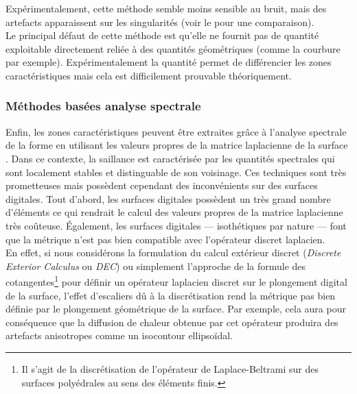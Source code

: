 %
Expérimentalement, cette méthode semble moins sensible au bruit, mais des
artefacts apparaissent sur les singularités (voir le
 pour une comparaison).
%
\\
%
Le principal défaut de cette méthode est qu'elle ne fournit pas de quantité
exploitable directement reliée à des quantités géométriques (comme la courbure
par exemple). Expérimentalement la quantité permet de différencier les zones
caractéristiques mais cela est difficilement prouvable théoriquement.
%
\subsubsection{Méthodes basées analyse spectrale}%
\label{sec:applications:feature:spectral}
%
Enfin, les zones caractéristiques peuvent être extraites grâce à l'analyse
spectrale de la forme en utilisant les valeurs propres de la matrice laplacienne
de la surface \cite{GebalBAL09,Sun2009,Song2014}. Dans ce contexte, la saillance
est caractérisée par les quantités spectrales qui sont localement stables et
distinguable de son voisinage. Ces techniques sont très prometteuses mais
possèdent cependant des inconvénients sur des surfaces digitales. Tout d'abord,
les surfaces digitales possèdent un très grand nombre d'éléments ce qui rendrait
le calcul des valeurs propres de la matrice laplacienne très coûteuse.
Également, les surfaces digitales --- isothétiques par nature --- font que la
métrique n'est pas bien compatible avec l'opérateur discret laplacien.
%
\\
%
En effet, si nous considérons la formulation du calcul extérieur discret
(\emph{Discrete Exterior Calculus} ou \emph{DEC}) ou simplement l'approche de la
formule des cotangentes\footnote{Il s'agit de la discrétisation de l'opérateur
de Laplace-Beltrami sur des surfaces polyédrales au sens des éléments finis.}
pour définir un opérateur laplacien discret sur le plongement digital de la
surface, l'effet d'escaliers dû à la discrétisation rend la métrique pas bien
définie par le plongement géométrique de la surface. Par exemple, cela aura pour
conséquence que la diffusion de chaleur obtenue par cet opérateur produira des
artefacts anisotropes comme un isocontour ellipsoïdal.
%
